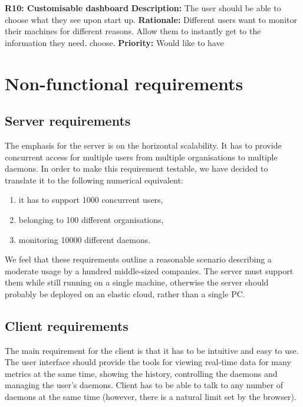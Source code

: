 \documentclass{l3proj}
\begin{document}
\textbf{R10: Customisable dashboard} \newline
\textbf{Description:} The user should be able to choose what they see upon start up. \newline
\textbf{Rationale:} Different users want to monitor their machines for different reasons. Allow them to instantly get to the information they need. choose. \newline
\textbf{Priority:} Would like to have

\section{Non-functional requirements}


\subsection{Server requirements}

The emphasis for the server is on the horizontal scalability. It has to provide concurrent access for multiple users from multiple organisations to multiple daemons. In order to make this requirement testable, we have decided to translate it to the following numerical equivalent:
\begin{enumerate}
\item it has to support 1000 concurrent users,
\item belonging to 100 different organisations,
\item monitoring 10000 different daemons.
\end{enumerate}

We feel that these requirements outline a reasonable scenario describing a moderate usage by a hundred middle-sized companies. The server must support them while still running on a single machine, otherwise the server should probably be deployed on an elastic cloud, rather than a single PC.

\subsection{Client requirements}

The main requirement for the client is that it has to be intuitive and easy to use. The user interface should provide the tools for viewing real-time data for many metrics at the same time, showing the history, controlling the daemons and managing the user's daemons. Client has to be able to talk to any number of daemons at the same time (however, there is a natural limit set by the browser).
\end{document}
